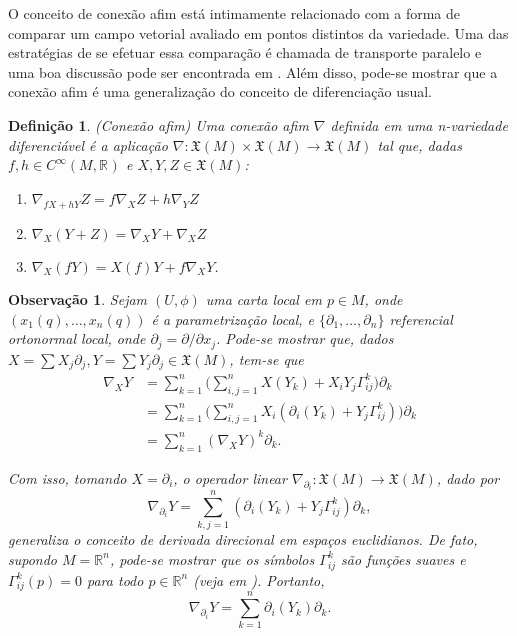 \documentclass[12pt]{book}
\newtheorem{definicao}[teorema]{Definição}
\newtheorem{observacao}[teorema]{Observação}
\newcommand{\campossuaves}[1]{\mathfrak{X}(#1)}
\newcommand{\funcoessuaves}[1]{C^{\infty}(#1, \real{})}
\newcommand{\real}[1]{\mathbb{R}^{#1}}
\begin{document}
	O conceito de conexão afim está intimamente relacionado com a forma de comparar um campo vetorial avaliado em pontos distintos da variedade. Uma das estratégias de se efetuar essa comparação é chamada de transporte paralelo e uma boa discussão pode ser encontrada em \cite{nakahara}. Além disso, pode-se mostrar que a conexão afim é uma generalização do conceito de diferenciação usual.
	
	\begin{definicao}\label{definicao_conexao_afim}
		(Conexão afim) Uma conexão afim $\nabla$ definida em uma n-variedade diferenciável é a aplicação $\nabla: \campossuaves{M} \times \campossuaves{M} \to \campossuaves{M}$ tal que, dadas $f,h \in \funcoessuaves{M}$ e $X,Y,Z \in \campossuaves{M}$:
		\begin{enumerate}
			\item $\nabla_{fX+hY}Z = f\nabla_{X}Z+h\nabla_{Y}Z$
			\item $\nabla_{X}(Y+Z) = \nabla_{X}Y+ \nabla_{X}Z$
			\item $\nabla_{X}(fY) = X(f)Y+f\nabla_{X}Y$.
		\end{enumerate}
	\end{definicao}
	
	\begin{observacao}\label{observacao_conexao_afim}
		Sejam $(U, \phi)$ uma carta local em $p\in M$, onde $(x_{1}(q), \dots, x_{n}(q))$ é a parametrização local, e $\{\partial_{1}, \dots, \partial_{n}\}$ referencial ortonormal local, onde $\partial_{j} = \partial/\partial x_{j}$. Pode-se mostrar que, dados $X=\sum X_{j}\partial_{j}, Y=\sum Y_{j}\partial_{j} \in \campossuaves{M}$, tem-se que
		$$
		\begin{aligned}
		\nabla_{X}Y &= 
		\sum_{k=1}^{n} \Big( \sum_{i,j=1}^{n} X(Y_{k}) + X_{i}Y_{j} \Gamma^{k}_{ij}\Big)\partial_{k} 
		\\
		&= 
		\sum_{k=1}^{n} \Big( \sum_{i,j=1}^{n} X_{i} (\partial_{i}(Y_{k}) + Y_{j} \Gamma^{k}_{ij})\Big)\partial_{k} 
		\\
		&= \sum_{k=1}^{n} (\nabla_{X}Y)^{k}\partial_{k}.
		\end{aligned} 
		$$
		
		Com isso, tomando $X = \partial_{i}$, o operador linear $\nabla_{\partial_{i}}: \campossuaves{M} \to \campossuaves{M}$, dado por 
		$$
		\nabla_{\partial_{i}}Y = \sum_{k,j=1}^{n}  (\partial_{i}(Y_{k}) + Y_{j} \Gamma^{k}_{ij})\partial_{k},
		$$
		generaliza o conceito de derivada direcional em espaços euclidianos. De fato, supondo $M=\real{n}$, pode-se mostrar que os símbolos $\Gamma^{k}_{ij}$ são funções suaves e $\Gamma^{k}_{ij}(p)=0$ para todo $p \in \real{n}$ (veja em \cite{manfredo_riemannian_geo}). Portanto, 
		$$
		\nabla_{\partial_{i}}Y = \sum_{k=1}^{n}  \partial_{i}(Y_{k})\partial_{k}.
		$$
	\end{observacao}
	
\end{document}
